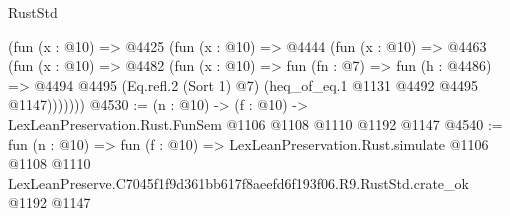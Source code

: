 \begin{lexlean}{RustStd}
\begin{coremodule}
      (fun (x : @10) =>
      @4425
        (fun (x : @10) =>
        @4444
          (fun (x : @10) =>
          @4463
            (fun (x : @10) =>
            @4482
              (fun (x : @10) =>
              fun (fn : @7) =>
              fun (h : @4486) =>
              @4494 @4495 (Eq.refl.{2} (Sort 1) @7) (heq_of_eq.{1} @1131 @4492 @4495 @1147)))))))
@4530 := (n : @10) -> (f : @10) -> LexLeanPreservation.Rust.FunSem @1106 @1108 @1110 @1192 @1147
@4540 := fun (n : @10) =>
  fun (f : @10) =>
  LexLeanPreservation.Rust.simulate
    @1106
    @1108
    @1110
    LexLeanPreserve.C7045f1f9d361bb617f8aeefd6f193f06.R9.RustStd.crate_ok
    @1192
    @1147
\end{coremodule}
\end{lexlean}
